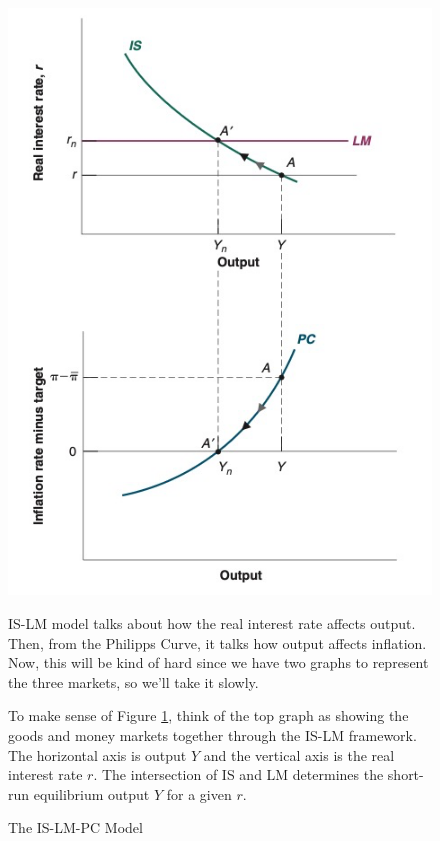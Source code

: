 \documentclass{extarticle}
\begin{document}
\begin{figure}[H] 
  \centering %
  \begin{minipage}{0.4\linewidth} 
    \centering 
    \includegraphics[width=\linewidth]{IS-LM-PC.png} 
    \caption{The IS-LM-PC Model} 
    \label{fig:IS-LM-PC} 
  \end{minipage}%
  \begin{minipage}{0.6\linewidth} 
    IS-LM model talks about how the real interest rate affects output.  Then, from the Philipps Curve, it talks how output affects inflation. Now, this will be kind of hard since we have two graphs to represent the three markets, so we'll take it slowly.

    \vspace{2mm}

    To make sense of Figure \ref{fig:IS-LM-PC}, think of the top graph as showing the goods and money markets together through the IS-LM framework. 
    The horizontal axis is output $Y$ and the vertical axis is the real interest rate $r$. The intersection of IS and LM determines the short-run equilibrium output $Y$ for a given $r$.


\end{minipage}
\end{figure}
\end{document}
